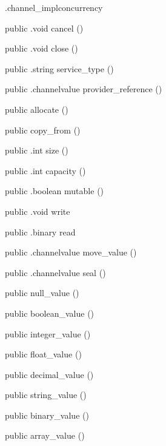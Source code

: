 \begin{CrexxClass}{.channel\_impl}{concurrency}
\begin{Members}
    \Method
      {public}
      {.void}
      {cancel}
      {()}

    \Method
      {public}
      {.void}
      {close}
      {()}

    \Method
      {public}
      {.string}
      {service\_type}
      {()}

    \Method
      {public}
      {.channelvalue}
      {provider\_reference}
      {()}

    \Factory
      {public}
      {allocate}
      {()}

    \Factory
      {public}
      {copy\_from}
      {()}

    \Method
      {public}
      {.int}
      {size}
      {()}

    \Method
      {public}
      {.int}
      {capacity}
      {()}

    \Method
      {public}
      {.boolean}
      {mutable}
      {()}

    \Method
      {public}
      {.void}
      {write}
      {}

    \Method
      {public}
      {.binary}
      {read}
      {}

    \Method
      {public}
      {.channelvalue}
      {move\_value}
      {()}

    \Method
      {public}
      {.channelvalue}
      {seal}
      {()}

    \Factory
      {public}
      {null\_value}
      {()}

    \Factory
      {public}
      {boolean\_value}
      {()}

    \Factory
      {public}
      {integer\_value}
      {()}

    \Factory
      {public}
      {float\_value}
      {()}

    \Factory
      {public}
      {decimal\_value}
      {()}

    \Factory
      {public}
      {string\_value}
      {()}

    \Factory
      {public}
      {binary\_value}
      {()}

    \Factory
      {public}
      {array\_value}
      {()}


\end{Members}
\end{CrexxClass}
